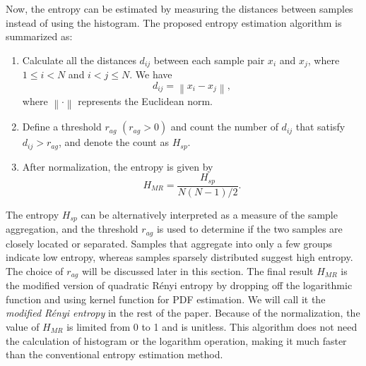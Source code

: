 \documentclass[journal,comsoc]{IEEEtran}
\begin{document}
Now, the entropy can be estimated by  measuring the distances between samples instead of using the histogram.
The proposed entropy estimation algorithm is summarized as:
\begin{enumerate}
\item Calculate all the distances \(d_{ij}\) between each sample pair \(x_i\) and \(x_j\), where \(1\le i<N\) and \( i<j \le N\). We have
 \begin{equation}
d_{ij}=\left\|x_i-x_j \right\|,
\label{eq:distance}
\end{equation}
where \(\left\| \cdot \right\|\) represents the Euclidean norm.
\item Define a threshold \(r_{ag}\) \((r_{ag}>0)\) and count the number of \(d_{ij}\) that satisfy $d_{ij}>r_{ag}$, and denote the count as $H_{sp}$.
\item After normalization, the entropy is given by
\begin{equation}
H_{MR}= \frac{ H_{sp}}{ N(N-1)/2}.
\label{eq:entorpy_ad}
\end{equation}
\end{enumerate}


The entropy \(H_{sp}\) can be alternatively interpreted as a measure of the sample aggregation,
and the threshold \(r_{ag}\) is used to determine if the two samples are closely located or separated.
Samples that aggregate into only a few groups indicate low entropy, whereas samples sparsely distributed suggest high entropy.
The choice of \(r_{ag}\) will be discussed later in this section.
The final result \(H_{MR}\) is the modified version of quadratic R\'enyi entropy  by dropping off the logarithmic function and using kernel function for PDF estimation.
We will call it the \textit{modified R\'enyi entropy} in the rest of the paper.
Because of the normalization, the value of $H_{MR}$ is limited from 0 to 1 and is unitless.
This algorithm does not need the calculation of histogram or the logarithm operation, making it much faster than the conventional entropy estimation method.

\end{document}
